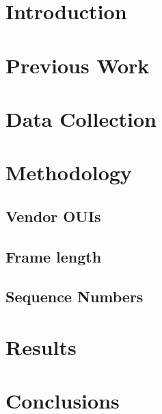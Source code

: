 \documentclass[11t, a4paper, twocolumn]{article}
\begin{document}
	\section{Introduction}\label{intro}

		
	\section{Previous Work}\label{prev}
		\lipsum[1-2]
		\citep{vanhoef2016}
		\citep{matte2016}
		\citep{martin2017}
		\citep{vo2016}
		\citep{konto2017}
	\section{Data Collection}\label{data}
		\lipsum[1-2]
	\section{Methodology}\label{method}
		\lipsum[1]
		\subsection{Vendor OUIs}
			\lipsum[2]
		\subsection{Frame length}
			\lipsum[2]
		\subsection{Sequence Numbers}
			\lipsum[2]

	\section{Results}\label{res}
		\lipsum[1]
	\section{Conclusions}\label{con}
		\lipsum[1-2]

	\printbibliography[title={References}]
\end{document}
